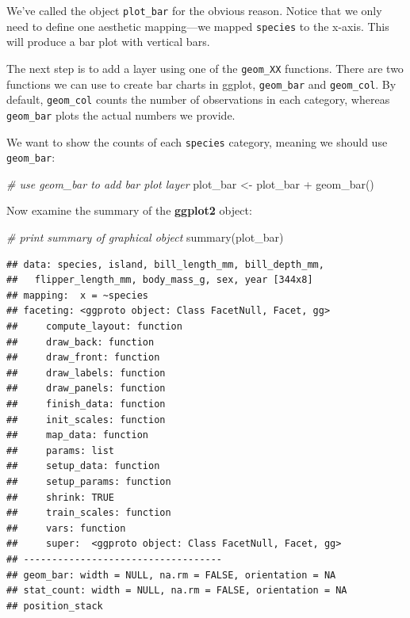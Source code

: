 \documentclass[
]{book}
\newenvironment{Shaded}{\begin{snugshade}}{\end{snugshade}}
\newcommand{\CommentTok}[1]{\textcolor[rgb]{0.56,0.35,0.01}{\textit{#1}}}
\newcommand{\FunctionTok}[1]{\textcolor[rgb]{0.00,0.00,0.00}{#1}}
\newcommand{\NormalTok}[1]{#1}
\newcommand{\OtherTok}[1]{\textcolor[rgb]{0.56,0.35,0.01}{#1}}
\newcommand{\SpecialCharTok}[1]{\textcolor[rgb]{0.00,0.00,0.00}{#1}}
\begin{document}
We've called the object \texttt{plot\_bar} for the obvious reason. Notice that we only need to define one aesthetic mapping---we mapped \texttt{species} to the x-axis. This will produce a bar plot with vertical bars.

The next step is to add a layer using one of the \texttt{geom\_XX} functions. There are two functions we can use to create bar charts in ggplot, \texttt{geom\_bar} and \texttt{geom\_col}. By default, \texttt{geom\_col} counts the number of observations in each category, whereas \texttt{geom\_bar} plots the actual numbers we provide.

We want to show the counts of each \texttt{species} category, meaning we should use \texttt{geom\_bar}:

\begin{Shaded}
\begin{Highlighting}[]
\CommentTok{\# use geom\_bar to add bar plot layer}
\NormalTok{plot\_bar }\OtherTok{\textless{}{-}}\NormalTok{ plot\_bar }\SpecialCharTok{+} \FunctionTok{geom\_bar}\NormalTok{()}
\end{Highlighting}
\end{Shaded}

Now examine the summary of the \textbf{ggplot2} object:

\begin{Shaded}
\begin{Highlighting}[]
\CommentTok{\# print summary of graphical object}
\FunctionTok{summary}\NormalTok{(plot\_bar) }
\end{Highlighting}
\end{Shaded}

\begin{verbatim}
## data: species, island, bill_length_mm, bill_depth_mm,
##   flipper_length_mm, body_mass_g, sex, year [344x8]
## mapping:  x = ~species
## faceting: <ggproto object: Class FacetNull, Facet, gg>
##     compute_layout: function
##     draw_back: function
##     draw_front: function
##     draw_labels: function
##     draw_panels: function
##     finish_data: function
##     init_scales: function
##     map_data: function
##     params: list
##     setup_data: function
##     setup_params: function
##     shrink: TRUE
##     train_scales: function
##     vars: function
##     super:  <ggproto object: Class FacetNull, Facet, gg>
## -----------------------------------
## geom_bar: width = NULL, na.rm = FALSE, orientation = NA
## stat_count: width = NULL, na.rm = FALSE, orientation = NA
## position_stack
\end{verbatim}
\end{document}
